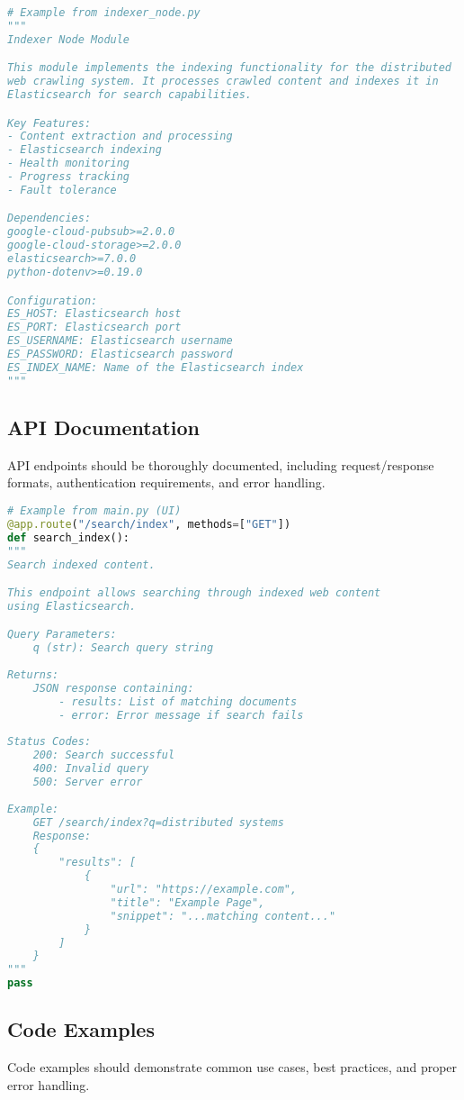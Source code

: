 \documentclass[12pt,a4paper]{report}
\begin{document}
\begin{lstlisting}[language=Python]
# Example from indexer_node.py
"""
Indexer Node Module

This module implements the indexing functionality for the distributed
web crawling system. It processes crawled content and indexes it in
Elasticsearch for search capabilities.

Key Features:
- Content extraction and processing
- Elasticsearch indexing
- Health monitoring
- Progress tracking
- Fault tolerance

Dependencies:
google-cloud-pubsub>=2.0.0
google-cloud-storage>=2.0.0
elasticsearch>=7.0.0
python-dotenv>=0.19.0

Configuration:
ES_HOST: Elasticsearch host
ES_PORT: Elasticsearch port
ES_USERNAME: Elasticsearch username
ES_PASSWORD: Elasticsearch password
ES_INDEX_NAME: Name of the Elasticsearch index
"""
\end{lstlisting}

\subsection{API Documentation}
API endpoints should be thoroughly documented, including request/response formats, authentication requirements, and error handling.

\begin{lstlisting}[language=Python]
# Example from main.py (UI)
@app.route("/search/index", methods=["GET"])
def search_index():
"""
Search indexed content.

This endpoint allows searching through indexed web content
using Elasticsearch.

Query Parameters:
    q (str): Search query string
    
Returns:
    JSON response containing:
        - results: List of matching documents
        - error: Error message if search fails
        
Status Codes:
    200: Search successful
    400: Invalid query
    500: Server error
    
Example:
    GET /search/index?q=distributed systems
    Response:
    {
        "results": [
            {
                "url": "https://example.com",
                "title": "Example Page",
                "snippet": "...matching content..."
            }
        ]
    }
"""
pass
\end{lstlisting}

\subsection{Code Examples}
Code examples should demonstrate common use cases, best practices, and proper error handling.
\end{document}

